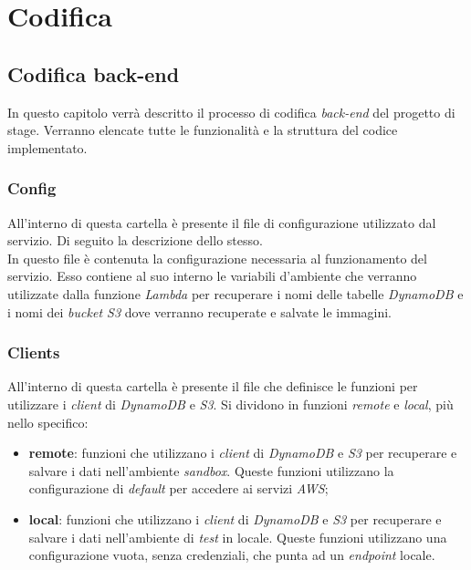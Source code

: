 \chapter{Codifica}
\label{cap:codifica}


\section{Codifica back-end}

In questo capitolo verrà descritto il processo di codifica \emph{back-end} del
progetto di stage. Verranno elencate tutte le funzionalità e la struttura del
codice implementato.

\subsection{Config}

All'interno di questa cartella è presente il file di configurazione utilizzato
dal servizio. Di seguito la descrizione dello stesso. \\
In questo file è contenuta la configurazione necessaria al funzionamento del servizio.
Esso contiene al suo interno le variabili d'ambiente che verranno utilizzate
dalla funzione \emph{Lambda} per recuperare i nomi delle tabelle \emph{DynamoDB}
e i nomi dei \emph{bucket S3} dove verranno recuperate e salvate le immagini.

\subsection{Clients}

All'interno di questa cartella è presente il file che definisce le funzioni per
utilizzare i \emph{client} di \emph{DynamoDB} e \emph{S3}. Si dividono in funzioni \emph{remote} e
\emph{local}, più nello specifico:
\begin{itemize}
      \item \textbf{remote}: funzioni che utilizzano i \emph{client} di
            \emph{DynamoDB} e \emph{S3} per recuperare e salvare i dati nell'ambiente
            \emph{sandbox}. Queste funzioni utilizzano la configurazione di
            \emph{default} per accedere ai servizi \emph{AWS};
      \item \textbf{local}: funzioni che utilizzano i \emph{client} di
            \emph{DynamoDB} e \emph{S3} per recuperare e salvare i dati nell'ambiente di
            \emph{test} in locale. Queste funzioni utilizzano una configurazione vuota,
            senza credenziali, che punta ad un \emph{endpoint} locale.
\end{itemize}

